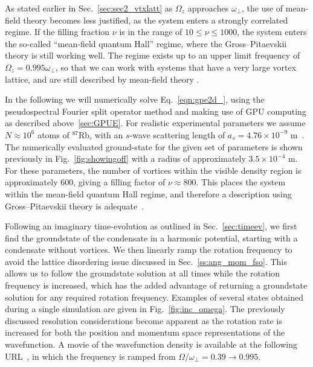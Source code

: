 As stated earlier in Sec.~\ref{sec:sec2_vtxlatt} as $\Omega_z$ approaches $\omega_\perp$, the use of mean-field theory becomes less justified, as the system enters a strongly correlated regime. If the filling fraction $\nu$ is in the range of $10 \leq \nu \leq 1000$, the system enters the so-called ``mean-field quantum Hall'' regime, where the Gross--Pitaevskii theory is still working well. The regime exists up to an upper limit frequency of $\Omega_z = 0.995\omega_\perp$, so that we can work with systems that have a very large vortex lattice, and are still described by mean-field theory \cite{BEC:Fetter_revmodphys_2009}.

In the following we will numerically solve Eq.~\eqref{eqn:gpe2d_}, using the pseudospectral Fourier split operator method and making use of GPU computing as described above~\ref{sec:GPUE}. For realistic experimental parameters we assume  $N\approx 10^6$ atoms of $^{87}$Rb, with an $s$-wave scattering length of $a_s=4.76\times10^{-9}$ m~\cite{AO:Roberts_prl_1998}. The numerically evaluated ground-state for the given set of parameters is shown previously in Fig.~\ref{fig:showingoff} with a radius of approximately $3.5\times 10^{-4}$ m. For these parameters, the number of vortices within the visible density region is approximately 600, giving a filling factor of $\nu \approx 800 $. This places the system within the mean-field quantum Hall regime, and therefore a description using Gross--Pitaevskii theory is adequate~\cite{Vtx:Schweikhard_prl_2004}.

Following an imaginary time-evolution as outlined in Sec.~\ref{sec:timeev}, we first find the groundstate of the condensate in a harmonic potential, starting with a condensate without vortices. We then linearly ramp the rotation frequency to avoid the lattice disordering issue discussed in Sec.~\ref{ss:ang_mom_fso}. This allows us to follow the groundstate solution at all times while the rotation frequency is increased, which has the added advantage of returning a groundstate solution for any required rotation frequency. Examples of several states obtained during a single simulation are given in Fig.~\ref{fig:inc_omega}. The previously discussed resolution considerations become apparent as the rotation rate is increased for both the position and momentum space representations of the wavefunction. A movie of the wavefunction density is available at the following URL~\cite{YT:BEC_gen}, in which the frequency is ramped from $\Omega/\omega_\perp = 0.39 \to 0.995$.

